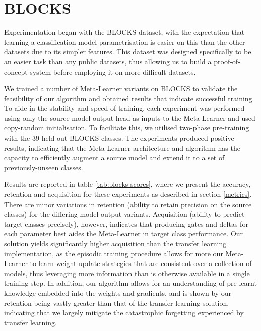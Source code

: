 \documentclass{report}
\begin{document}
\section{BLOCKS}
Experimentation began with the BLOCKS dataset, with the expectation that learning a classification model parametrisation is easier on this than the other datasets due to its simpler features. This dataset was designed specifically to be an easier task than any public datasets, thus allowing us to build a proof-of-concept system before employing it on more difficult datasets. \par
We trained a number of Meta-Learner variants on BLOCKS to validate the feasibility of our algorithm and obtained results that indicate successful training. To aide in the stability and speed of training, each experiment was performed using only the source model output head as inputs to the Meta-Learner and used copy-random initialisation. To facilitate this, we utilised two-phase pre-training with the 39 held-out BLOCKS classes. The experiments produced positive results, indicating that the Meta-Learner architecture and algorithm has the capacity to efficiently augment a source model and extend it to a set of previously-unseen classes. \par
Results are reported in table \ref{tab:blocks-scores}, where we present the accuracy, retention and acquisition for these experiments as described in section \ref{metrics}. 
There are minor variations in retention (ability to retain precision on the source classes) for the differing model output variants. Acquisition (ability to predict target classes precisely), however, indicates that producing gates and deltas for each parameter best aides the Meta-Learner in target class performance. Our solution yields significantly higher acquisition than the transfer learning implementation, as the episodic training procedure allows for more our Meta-Learner to learn weight update strategies that are consistent over a collection of models, thus leveraging more information than is otherwise available in a single training step. In addition, our algorithm allows for an understanding of pre-learnt knowledge embedded into the weights and gradients, and is shown by our retention being vastly greater than that of the transfer learning solution, indicating that we largely mitigate the catastrophic forgetting experienced by transfer learning. \par
\end{document}
